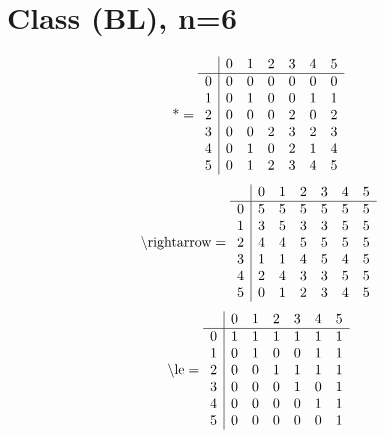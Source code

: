 \documentclass[11pt]{article}
\begin{document}
\section{Class (BL), n=6}
\[\text{*} = 
\begin{array}{r | r r r r r r}
 & 0 & 1 & 2 & 3 & 4 & 5 \\ \hline
0 & 0 & 0 & 0 & 0 & 0 & 0 \\
1 & 0 & 1 & 0 & 0 & 1 & 1 \\
2 & 0 & 0 & 0 & 2 & 0 & 2 \\
3 & 0 & 0 & 2 & 3 & 2 & 3 \\
4 & 0 & 1 & 0 & 2 & 1 & 4 \\
5 & 0 & 1 & 2 & 3 & 4 & 5 \\
\end{array}
\]
\[\text{\textbackslash rightarrow} = 
\begin{array}{r | r r r r r r}
 & 0 & 1 & 2 & 3 & 4 & 5 \\ \hline
0 & 5 & 5 & 5 & 5 & 5 & 5 \\
1 & 3 & 5 & 3 & 3 & 5 & 5 \\
2 & 4 & 4 & 5 & 5 & 5 & 5 \\
3 & 1 & 1 & 4 & 5 & 4 & 5 \\
4 & 2 & 4 & 3 & 3 & 5 & 5 \\
5 & 0 & 1 & 2 & 3 & 4 & 5 \\
\end{array}
\]
\[\text{\textbackslash le} = 
\begin{array}{r | r r r r r r}
 & 0 & 1 & 2 & 3 & 4 & 5 \\ \hline
0 & 1 & 1 & 1 & 1 & 1 & 1 \\
1 & 0 & 1 & 0 & 0 & 1 & 1 \\
2 & 0 & 0 & 1 & 1 & 1 & 1 \\
3 & 0 & 0 & 0 & 1 & 0 & 1 \\
4 & 0 & 0 & 0 & 0 & 1 & 1 \\
5 & 0 & 0 & 0 & 0 & 0 & 1 \\
\end{array}
\]
\end{document}
